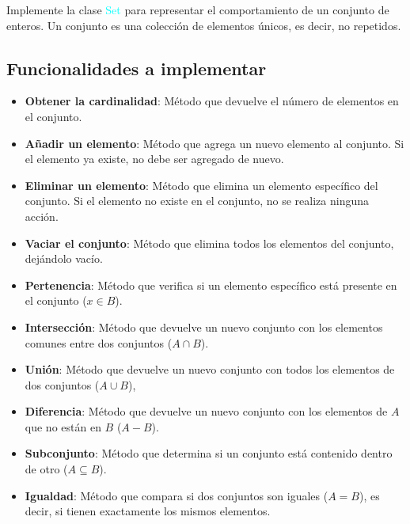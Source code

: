 Implemente la clase \textcolor{cyan}{Set} para representar el comportamiento de un conjunto de enteros. Un conjunto es una colección de elementos únicos, es decir, no repetidos.

\subsection*{Funcionalidades a implementar}
\begin{itemize}
    \item \textbf{Obtener la cardinalidad}: 
    Método que devuelve el número de elementos en el conjunto.
    
    \item \textbf{Añadir un elemento}: 
    Método que agrega un nuevo elemento al conjunto. Si el elemento ya existe, no debe ser agregado de nuevo.
    
    \item \textbf{Eliminar un elemento}: 
    Método que elimina un elemento específico del conjunto. Si el elemento no existe en el conjunto, no se realiza ninguna acción.
    
    \item \textbf{Vaciar el conjunto}: 
    Método que elimina todos los elementos del conjunto, dejándolo vacío.

    \item \textbf{Pertenencia}: 
    Método que verifica si un elemento específico está presente en el conjunto (\(x \in B\)).
    
    \item \textbf{Intersección}: 
    Método que devuelve un nuevo conjunto con los elementos comunes entre dos conjuntos (\(A \cap B\)).
    
    \item \textbf{Unión}: 
    Método que devuelve un nuevo conjunto con todos los elementos de dos conjuntos (\(A \cup B\)),
    
    \item \textbf{Diferencia}: 
    Método que devuelve un nuevo conjunto con los elementos de \(A\) que no están en \(B\) (\(A - B\)).
    
    \item \textbf{Subconjunto}: 
    Método que determina si un conjunto está contenido dentro de otro (\(A \subseteq B\)).
    
    \item \textbf{Igualdad}: 
    Método que compara si dos conjuntos son iguales (\(A = B\)), es decir, si tienen exactamente los mismos elementos.
\end{itemize}

